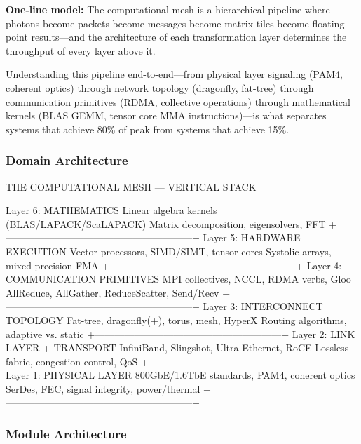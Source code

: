 \documentclass[11pt,letterpaper]{article}
\begin{document}
\begin{quotebox}
\textbf{One-line model:} The computational mesh is a hierarchical pipeline where photons become packets become messages become matrix tiles become floating-point results---and the architecture of each transformation layer determines the throughput of every layer above it.
\end{quotebox}

Understanding this pipeline end-to-end---from physical layer signaling (PAM4, coherent optics) through network topology (dragonfly, fat-tree) through communication primitives (RDMA, collective operations) through mathematical kernels (BLAS GEMM, tensor core MMA instructions)---is what separates systems that achieve 80\% of peak from systems that achieve 15\%.

\subsubsection{Domain Architecture}

\begin{asciibox}
THE COMPUTATIONAL MESH --- VERTICAL STACK

Layer 6: MATHEMATICS
  Linear algebra kernels (BLAS/LAPACK/ScaLAPACK)
  Matrix decomposition, eigensolvers, FFT
  +---------------------------------------------------------+
Layer 5: HARDWARE EXECUTION
  Vector processors, SIMD/SIMT, tensor cores
  Systolic arrays, mixed-precision FMA
  +---------------------------------------------------------+
Layer 4: COMMUNICATION PRIMITIVES
  MPI collectives, NCCL, RDMA verbs, Gloo
  AllReduce, AllGather, ReduceScatter, Send/Recv
  +---------------------------------------------------------+
Layer 3: INTERCONNECT TOPOLOGY
  Fat-tree, dragonfly(+), torus, mesh, HyperX
  Routing algorithms, adaptive vs. static
  +---------------------------------------------------------+
Layer 2: LINK LAYER + TRANSPORT
  InfiniBand, Slingshot, Ultra Ethernet, RoCE
  Lossless fabric, congestion control, QoS
  +---------------------------------------------------------+
Layer 1: PHYSICAL LAYER
  800GbE/1.6TbE standards, PAM4, coherent optics
  SerDes, FEC, signal integrity, power/thermal
  +---------------------------------------------------------+
\end{asciibox}

\subsubsection{Module Architecture}
\end{document}
